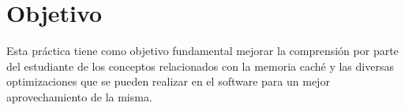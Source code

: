 \section{Objetivo}

Esta práctica tiene como objetivo fundamental mejorar la comprensión por parte
del estudiante de los conceptos relacionados con la memoria caché y las
diversas optimizaciones que se pueden realizar en el software para un mejor
aprovechamiento de la misma.
